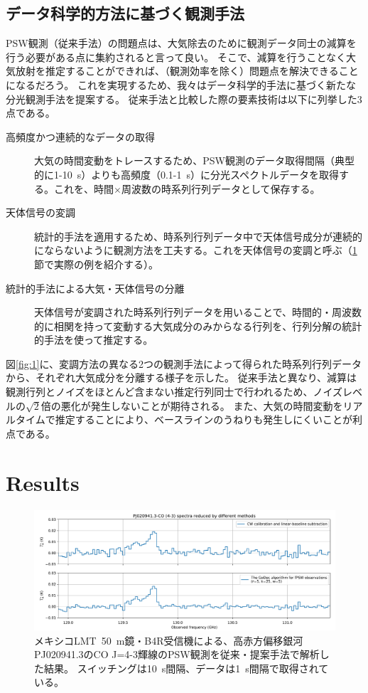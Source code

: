 \documentclass[a4paper,10pt,oneside,twocolumn,notitlepage,final]{jarticle}
\begin{document}
\subsection{データ科学的方法に基づく観測手法}

PSW観測（従来手法）の問題点は、大気除去のために観測データ同士の減算を行う必要がある点に集約されると言って良い。
そこで、減算を行うことなく大気放射を推定することができれば、（観測効率を除く）問題点を解決できることになるだろう。
これを実現するため、我々はデータ科学的手法に基づく新たな分光観測手法を提案する。
従来手法と比較した際の要素技術は以下に列挙した3点である。

\begin{description}
    \item[高頻度かつ連続的なデータの取得] 大気の時間変動をトレースするため、PSW観測のデータ取得間隔（典型的に1-10~s）よりも高頻度（0.1-1~s）に分光スペクトルデータを取得する。これを、時間$\times$周波数の時系列行列データとして保存する。
    \item[天体信号の変調] 統計的手法を適用するため、時系列行列データ中で天体信号成分が連続的にならないように観測方法を工夫する。これを天体信号の変調と呼ぶ（\ref{s:results}節で実際の例を紹介する）。
    \item[統計的手法による大気・天体信号の分離] 天体信号が変調された時系列行列データを用いることで、時間的・周波数的に相関を持って変動する大気成分のみからなる行列を、行列分解の統計的手法を使って推定する。
\end{description}

図\ref{fig:1}に、変調方法の異なる2つの観測手法によって得られた時系列行列データから、それぞれ大気成分を分離する様子を示した。
従来手法と異なり、減算は観測行列とノイズをほとんど含まない推定行列同士で行われるため、ノイズレベルの$\sqrt{2}$倍の悪化が発生しないことが期待される。
また、大気の時間変動をリアルタイムで推定することにより、ベースラインのうねりも発生しにくいことが利点である。

\section{Results}
\label{s:results}


\begin{figure}[t]
    \centering
    \includegraphics[width=\textwidth]{figures/figure-3}
    \caption{
        メキシコLMT~50~m鏡・B4R受信機による、高赤方偏移銀河PJ020941.3のCO J=4-3輝線のPSW観測を従来・提案手法で解析した結果。
        スイッチングは10~s間隔、データは1~s間隔で取得されている。
    }
    \label{fig:3}
\end{figure}
\end{document}
